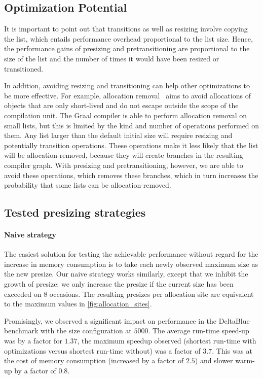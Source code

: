 \documentclass[sigconf, review, balance=false]{acmart}
\begin{document}
\subsection{Optimization Potential}
It is important to point out that transitions as well as resizing
involve copying the list, which entails performance overhead
proportional to the list size. Hence, the performance gains of
presizing and pretransitioning are proportional to the size of the
list and the number of times it would have been resized or
transitioned.

In addition, avoiding resizing and transitioning can help other
optimizations to be more effective. For example, allocation
removal~\cite{bolz2011allocation} aims to avoid allocations of objects
that are only short-lived and do not escape outside the scope of the
compilation unit. The Graal compiler is able to perform allocation
removal on small lists, but this is limited by the kind and number of operations
performed on them. Any list larger than the default initial size will
require resizing and potentially transition operations. These
operations make it less likely that the list will be
allocation-removed, because they will create branches in the resulting
compiler graph. With presizing and pretransitioning, however, we are
able to avoid these operations, which removes these branches, which in
turn increases the probability that some lists can be
allocation-removed.

\subsection{Tested presizing strategies}
\paragraph{Naive strategy}
The easiest solution for testing the achievable performance without
regard for the increase in memory consumption is to take each newly
observed maximum size as the new presize. Our naive strategy works
similarly, except that we inhibit the growth of presize: we only
increase the presize if the current size has been exceeded on $8$
occasions. The resulting presizes per allocation site are equivalent
to the maximum values in \autoref{fig:allocation_sites}.

Promisingly, we observed a significant impact on performance in the
DeltaBlue benchmark with the size configuration at $5000$. The average
run-time speed-up was by a factor for $1.37$, the maximum speedup
observed (shortest run-time with optimizations versus shortest
run-time without) was a factor of $3.7$. This was at the cost of
memory consumption (increased by a factor of $2.5$) and slower warm-up
by a factor of $0.8$.
\end{document}

